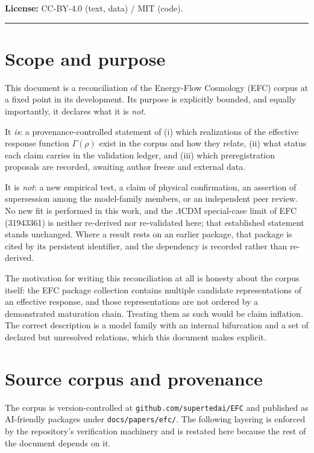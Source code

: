 \documentclass[11pt,a4paper]{article}
\begin{document}
\noindent\textbf{License:} CC-BY-4.0 (text, data) / MIT (code).

\vspace{1em}
\color{rulegray}\hrule\color{black}

\section{Scope and purpose}

This document is a reconciliation of the Energy-Flow Cosmology (EFC) corpus at a fixed point in its development. Its purpose is explicitly bounded, and equally importantly, it declares what it is \emph{not}.

It \emph{is}: a provenance-controlled statement of (i) which realizations of the effective response function $\Gamma(\rho)$ exist in the corpus and how they relate, (ii) what status each claim carries in the validation ledger, and (iii) which preregistration proposals are recorded, awaiting author freeze and external data.

It is \emph{not}: a new empirical test, a claim of physical confirmation, an assertion of supersession among the model-family members, or an independent peer review. No new fit is performed in this work, and the $\Lambda$CDM special-case limit of EFC (31943361) is neither re-derived nor re-validated here; that established statement stands unchanged. Where a result rests on an earlier package, that package is cited by its persistent identifier, and the dependency is recorded rather than re-derived.

The motivation for writing this reconciliation at all is honesty about the corpus itself: the EFC package collection contains multiple candidate representations of an effective response, and those representations are not ordered by a demonstrated maturation chain. Treating them as such would be claim inflation. The correct description is a model family with an internal bifurcation and a set of declared but unresolved relations, which this document makes explicit.

\section{Source corpus and provenance}

The corpus is version-controlled at \texttt{github.com/supertedai/EFC} and published as AI-friendly packages under \texttt{docs/papers/efc/}. The following layering is enforced by the repository's verification machinery and is restated here because the rest of the document depends on it.
\end{document}

